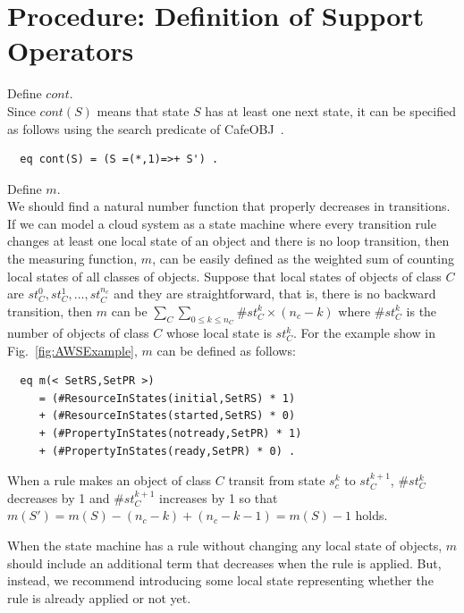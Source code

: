 \documentclass[12pt]{report}
\newcommand{\cafeobj}{{\sf CafeOBJ}~}
\begin{document}
\section{Procedure: Definition of Support Operators}
\label{sec:support}
 Define $cont$. \\ Since $cont(S)$ means that
state $S$ has at least one next state, it can be specified as follows
using the search predicate of \cafeobj.
\begin{verbatim}
  eq cont(S) = (S =(*,1)=>+ S') .
\end{verbatim}
 Define $m$. \\ We should find a natural
number function that properly decreases in transitions. If we can
model a cloud system as a state machine where every transition rule changes
at least one local state of an object and there is no loop transition,
then the measuring function, $m$, can be easily defined as the
weighted sum of counting local states of all classes of objects.
Suppose that local states of objects of class $C$ are $st_C^0, st_C^1,
\dots , st_C^{n_c}$ and they are straightforward, that is, there is no
backward transition, then $m$ can be $\sum_{C} \sum_{0 \le k \le n_C}
\#st_C^k \times (n_c - k)$ where $\#st_C^k$ is the number of objects
of class $C$ whose local state is $st_C^k$. For the example show in
Fig.~\ref{fig:AWSExample}, $m$ can be defined as follows:
\begin{verbatim}
  eq m(< SetRS,SetPR >)
     = (#ResourceInStates(initial,SetRS) * 1) 
     + (#ResourceInStates(started,SetRS) * 0)
     + (#PropertyInStates(notready,SetPR) * 1) 
     + (#PropertyInStates(ready,SetPR) * 0) .
\end{verbatim}
When a rule makes an object of class $C$ transit from state $s_c^k$ to
$st_C^{k+1}$, $\#st_C^k$ decreases by 1 and $\#st_C^{k+1}$ increases by 1 so that
$m(S')=m(S)-(n_c-k)+(n_c-k-1)=m(S)-1$ holds.

When the state machine has a rule without changing any local state
of objects, $m$ should include an additional term that decreases when
the rule is applied. But, instead, we recommend introducing some local
state representing whether the rule is already applied or not yet.
\end{document}
